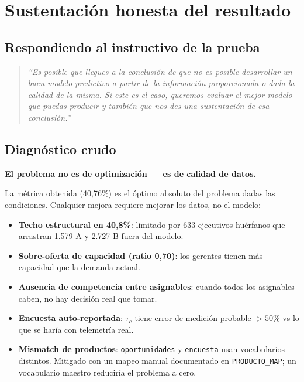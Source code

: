 \documentclass[11pt,a4paper]{article}
\begin{document}
\section{Sustentación honesta del resultado}

\subsection{Respondiendo al instructivo de la prueba}

\begin{quote}
\itshape \color{bcogrisoscuro}
``Es posible que llegues a la conclusión de que no es posible desarrollar un buen modelo predictivo a partir de la información proporcionada o dada la calidad de la misma. Si este es el caso, queremos evaluar el mejor modelo que puedas producir y también que nos des una sustentación de esa conclusión.''
\end{quote}

\subsection{Diagnóstico crudo}

\begin{honestybox}
\textbf{El problema no es de optimización --- es de calidad de datos.}

\medskip
La métrica obtenida (40,76\%) es el óptimo absoluto del problema dadas las condiciones. Cualquier mejora requiere mejorar los datos, no el modelo:

\begin{itemize}[leftmargin=*]
    \item \textbf{Techo estructural en 40,8\%}: limitado por 633 ejecutivos huérfanos que arrastran 1.579 A y 2.727 B fuera del modelo.
    \item \textbf{Sobre-oferta de capacidad (ratio 0,70)}: los gerentes tienen más capacidad que la demanda actual.
    \item \textbf{Ausencia de competencia entre asignables}: cuando todos los asignables caben, no hay decisión real que tomar.
    \item \textbf{Encuesta auto-reportada}: $\tau_c$ tiene error de medición probable $>50\%$ vs lo que se haría con telemetría real.
    \item \textbf{Mismatch de productos}: \texttt{oportunidades} y \texttt{encuesta} usan vocabularios distintos. Mitigado con un mapeo manual documentado en \texttt{PRODUCTO\_MAP}; un vocabulario maestro reduciría el problema a cero.
\end{itemize}
\end{honestybox}
\end{document}
